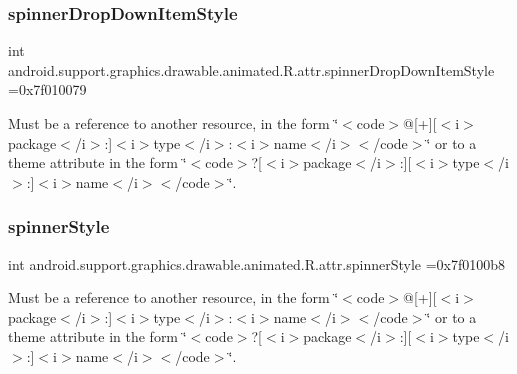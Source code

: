 \subsubsection{\texorpdfstring{spinner\+Drop\+Down\+Item\+Style}{spinnerDropDownItemStyle}}
{\footnotesize\ttfamily int android.\+support.\+graphics.\+drawable.\+animated.\+R.\+attr.\+spinner\+Drop\+Down\+Item\+Style =0x7f010079\hspace{0.3cm}{\ttfamily [static]}}

Must be a reference to another resource, in the form \char`\"{}$<$code$>$@\mbox{[}+\mbox{]}\mbox{[}$<$i$>$package$<$/i$>$\+:\mbox{]}$<$i$>$type$<$/i$>$\+:$<$i$>$name$<$/i$>$$<$/code$>$\char`\"{} or to a theme attribute in the form \char`\"{}$<$code$>$?\mbox{[}$<$i$>$package$<$/i$>$\+:\mbox{]}\mbox{[}$<$i$>$type$<$/i$>$\+:\mbox{]}$<$i$>$name$<$/i$>$$<$/code$>$\char`\"{}. \mbox{\label{classandroid_1_1support_1_1graphics_1_1drawable_1_1animated_1_1R_1_1attr_a8763aef2ad8c5697bc87f69d6e5f407a}} 
\subsubsection{\texorpdfstring{spinner\+Style}{spinnerStyle}}
{\footnotesize\ttfamily int android.\+support.\+graphics.\+drawable.\+animated.\+R.\+attr.\+spinner\+Style =0x7f0100b8\hspace{0.3cm}{\ttfamily [static]}}

Must be a reference to another resource, in the form \char`\"{}$<$code$>$@\mbox{[}+\mbox{]}\mbox{[}$<$i$>$package$<$/i$>$\+:\mbox{]}$<$i$>$type$<$/i$>$\+:$<$i$>$name$<$/i$>$$<$/code$>$\char`\"{} or to a theme attribute in the form \char`\"{}$<$code$>$?\mbox{[}$<$i$>$package$<$/i$>$\+:\mbox{]}\mbox{[}$<$i$>$type$<$/i$>$\+:\mbox{]}$<$i$>$name$<$/i$>$$<$/code$>$\char`\"{}. \mbox{\label{classandroid_1_1support_1_1graphics_1_1drawable_1_1animated_1_1R_1_1attr_a9fafb32db5b6d6ead09f6e5044e837f2}} 
